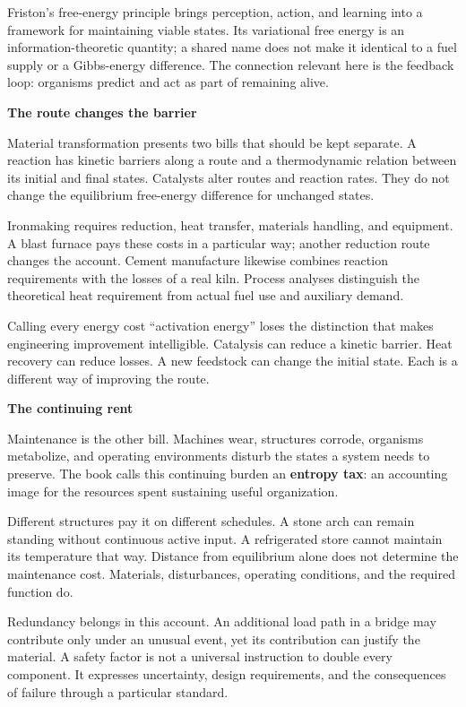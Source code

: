 \documentclass[11pt,openany]{book}
\newcommand{\term}[1]{\textbf{#1}}
\newcommand{\subhead}[1]{\par\medskip\noindent\textbf{#1}\par\nobreak\smallskip}
\begin{document}
Friston's free-energy principle brings perception, action, and learning into a framework for maintaining viable states.\cite{friston2010} Its variational free energy is an information-theoretic quantity; a shared name does not make it identical to a fuel supply or a Gibbs-energy difference. The connection relevant here is the feedback loop: organisms predict and act as part of remaining alive.

\subhead{The route changes the barrier}

Material transformation presents two bills that should be kept separate. A reaction has kinetic barriers along a route and a thermodynamic relation between its initial and final states. Catalysts alter routes and reaction rates. They do not change the equilibrium free-energy difference for unchanged states.

Ironmaking requires reduction, heat transfer, materials handling, and equipment. A blast furnace pays these costs in a particular way; another reduction route changes the account.\cite{babich2021blast} Cement manufacture likewise combines reaction requirements with the losses of a real kiln. Process analyses distinguish the theoretical heat requirement from actual fuel use and auxiliary demand.\cite{madivate1999theoretical,madlool2011cement}

Calling every energy cost “activation energy” loses the distinction that makes engineering improvement intelligible. Catalysis can reduce a kinetic barrier. Heat recovery can reduce losses. A new feedstock can change the initial state. Each is a different way of improving the route.

\subhead{The continuing rent}

Maintenance is the other bill. Machines wear, structures corrode, organisms metabolize, and operating environments disturb the states a system needs to preserve. The book calls this continuing burden an \term{entropy tax}: an accounting image for the resources spent sustaining useful organization.

Different structures pay it on different schedules. A stone arch can remain standing without continuous active input. A refrigerated store cannot maintain its temperature that way. Distance from equilibrium alone does not determine the maintenance cost. Materials, disturbances, operating conditions, and the required function do.

Redundancy belongs in this account. An additional load path in a bridge may contribute only under an unusual event, yet its contribution can justify the material. A safety factor is not a universal instruction to double every component. It expresses uncertainty, design requirements, and the consequences of failure through a particular standard.
\end{document}
